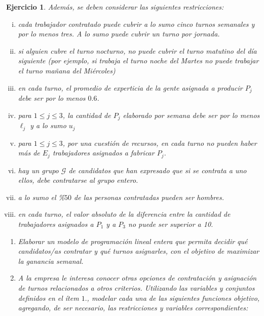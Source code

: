 \documentclass[a4paper,oneside,12pt]{amsart}
\newtheorem{quest}{Ejercicio}
\begin{document}
\begin{quest}
    Además, se deben considerar las siguientes restricciones:
    \begin{enumerate}[i.]
        \item cada trabajador contratado puede cubrir a lo sumo cinco turnos semanales y por lo menos tres. A lo sumo puede cubrir un turno por jornada.
        \item si alguien cubre el turno nocturno, no puede cubrir el turno matutino del día siguiente (por ejemplo, si trabaja el turno noche del Martes no puede trabajar el turno mañana del Miércoles)
        \item en cada turno, el promedio de experticia de la gente asignada a producir $P_j$ debe ser por lo menos $0.6$.
        \item para $1\leq j\leq 3$, la cantidad de $P_j$ elaborado por semana debe ser por lo menos $\ell_j$ y a lo sumo $u_j$
        \item para $1\leq j\leq 3$, por una cuestión de recursos, en cada turno no pueden haber más de $E_j$ trabajadores asignados a fabricar $P_j$.
        \item hay un grupo $\mathcal{G}$ de candidatos que han expresado que si se contrata a uno  ellos, debe contratarse al grupo entero.
        \item a lo sumo el \%$50$ de las personas contratadas pueden ser hombres.
        \item en cada turno, el valor absoluto de la diferencia entre la cantidad de trabajadores asignados a $P_1$ y a $P_3$ no puede ser superior a 10.
    \end{enumerate}
    \begin{enumerate}
        \item Elaborar un modelo de programación lineal entera que permita decidir qué candidatos/as contratar y qué turnos asignarles, con el objetivo de maximizar la ganancia semanal.
        \item A la empresa le interesa conocer otras opciones de contratación y asignación de turnos  relacionados a otros criterios. Utilizando las variables y conjuntos definidos en el ítem $1.$, modelar cada una de las siguientes funciones objetivo, agregando, de ser necesario, las restricciones y variables correspondientes:

\end{enumerate}
\end{quest}
\end{document}
